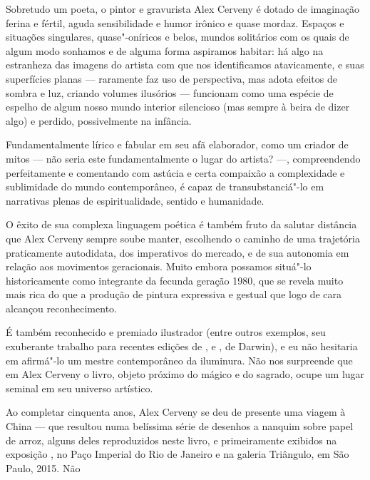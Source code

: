 \begin{multicols}{2}
Sobretudo um poeta, o pintor e gravurista Alex Cerveny é dotado de imaginação ferina e fértil, aguda sensibilidade e humor irônico e quase mordaz. Espaços e situações singulares, quase"-oníricos e belos, mundos solitários com os quais de algum modo sonhamos e de alguma forma aspiramos habitar: há algo na estranheza das imagens do artista com que nos identificamos atavicamente, e suas superfícies planas — raramente faz uso de perspectiva, mas adota efeitos de sombra e luz, criando volumes ilusórios — funcionam como uma espécie de espelho de algum nosso mundo interior silencioso (mas sempre à beira de dizer algo) e perdido, possivelmente na infância.

Fundamentalmente lírico e fabular em seu afã elaborador, como um criador de mitos — não seria este fundamentalmente o lugar do artista? —, compreendendo perfeitamente e comentando com astúcia e certa compaixão a complexidade e sublimidade do mundo contemporâneo, é capaz de transubstanciá"-lo em narrativas plenas de espiritualidade, sentido e humanidade.

O êxito de sua complexa linguagem poética é também fruto da salutar distância que Alex Cerveny sempre soube manter, escolhendo o caminho de uma trajetória praticamente autodidata, dos imperativos do mercado, e de sua autonomia em relação aos movimentos geracionais. Muito embora possamos situá"-lo historicamente como integrante da fecunda geração 1980, que se revela muito mais rica do que a produção de pintura expressiva e gestual que logo de cara alcançou reconhecimento. 

É também reconhecido e premiado ilustrador (entre outros exemplos, seu exuberante trabalho para recentes edições de {}, {} e {}, de Darwin), e eu não hesitaria em afirmá"-lo um mestre contemporâneo da iluminura. Não nos surpreende que em Alex Cerveny o livro, objeto próximo do mágico e do sagrado, ocupe um lugar seminal em seu universo artístico.

Ao completar cinquenta anos, Alex Cerveny se deu de presente uma viagem à China — que resultou numa belíssima série de desenhos a nanquim sobre
papel de arroz, alguns deles reproduzidos neste livro, e primeiramente exibidos na exposição {}, no Paço Imperial do Rio de Janeiro e na galeria Triângulo, em São Paulo, 2015. Não \linebreak



\end{multicols}
